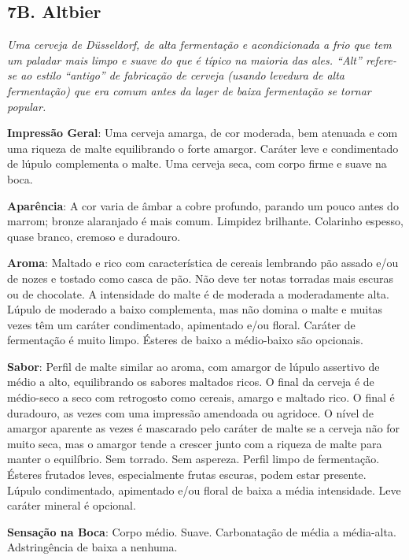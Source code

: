 \subsection*{7B. Altbier}

\textit{Uma cerveja de Düsseldorf, de alta fermentação e acondicionada a frio que tem um paladar mais limpo e suave do que é típico na maioria das ales. “Alt” refere-se ao estilo “antigo” de fabricação de cerveja (usando levedura de alta fermentação) que era comum antes da lager de baixa fermentação se tornar popular.}

\textbf{Impressão Geral}: Uma cerveja amarga, de cor moderada, bem atenuada e com uma riqueza de malte equilibrando o forte amargor. Caráter leve e condimentado de lúpulo complementa o malte. Uma cerveja seca, com corpo firme e suave na boca.

\textbf{Aparência}: A cor varia de âmbar a cobre profundo, parando um pouco antes do marrom; bronze alaranjado é mais comum. Limpidez brilhante. Colarinho espesso, quase branco, cremoso e duradouro.

\textbf{Aroma}: Maltado e rico com característica de cereais lembrando pão assado e/ou de nozes e tostado como casca de pão. Não deve ter notas torradas mais escuras ou de chocolate. A intensidade do malte é de moderada a moderadamente alta. Lúpulo de moderado a baixo complementa, mas não domina o malte e muitas vezes têm um caráter condimentado, apimentado e/ou floral. Caráter de fermentação é muito limpo. Ésteres de baixo a médio-baixo são opcionais.

\textbf{Sabor}: Perfil de malte similar ao aroma, com amargor de lúpulo assertivo de médio a alto, equilibrando os sabores maltados ricos. O final da cerveja é de médio-seco a seco com retrogosto como cereais, amargo e maltado rico. O final é duradouro, as vezes com uma impressão amendoada ou agridoce. O nível de amargor aparente as vezes é mascarado pelo caráter de malte se a cerveja não for muito seca, mas o amargor tende a crescer junto com a riqueza de malte para manter o equilíbrio. Sem torrado. Sem aspereza. Perfil limpo de fermentação. Ésteres frutados leves, especialmente frutas escuras, podem estar presente. Lúpulo condimentado, apimentado e/ou floral de baixa a média intensidade. Leve caráter mineral é opcional.

\textbf{Sensação na Boca}: Corpo médio. Suave. Carbonatação de média a média-alta. Adstringência de baixa a nenhuma.

